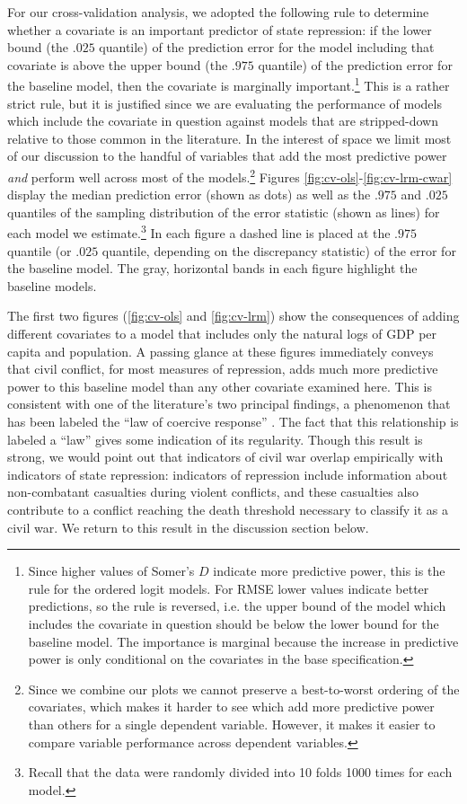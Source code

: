 \documentclass[11pt]{article}
\begin{document}
For our cross-validation analysis, we adopted the following rule to determine whether a covariate is an important predictor of state repression: if the lower bound (the $.025$ quantile) of the prediction error for the model including that covariate is above the upper bound (the $.975$ quantile) of the prediction error for the baseline model, then the covariate is marginally important.\footnote{Since higher values of Somer's $D$ indicate more predictive power, this is the rule for the ordered logit models. For RMSE lower values indicate better predictions, so the rule is reversed, i.e. the upper bound of the model which includes the covariate in question should be below the lower bound for the baseline model. The importance is marginal because the increase in predictive power is only conditional on the covariates in the base specification.} This is a rather strict rule, but it is justified since we are evaluating the performance of models which include the covariate in question against models that are stripped-down relative to those common in the literature. In the interest of space we limit most of our discussion to the handful of variables that add the most predictive power {\em and} perform well across most of the models.\footnote{Since we combine our plots we cannot preserve a best-to-worst ordering of the covariates, which makes it harder to see which add more predictive power than others for a single dependent variable. However, it makes it easier to compare variable performance across dependent variables.} Figures \ref{fig:cv-ols}-\ref{fig:cv-lrm-cwar} display the median prediction error (shown as dots) as well as the $.975$ and $.025$ quantiles of the sampling distribution of the error statistic (shown as lines) for each model we estimate.\footnote{Recall that the data were randomly divided into 10 folds 1000 times for each model.} In each figure a dashed line is placed at the $.975$ quantile (or $.025$ quantile, depending on the discrepancy statistic) of the error for the baseline model. The gray, horizontal bands in each figure highlight the baseline models.

The first two figures (\ref{fig:cv-ols} and \ref{fig:cv-lrm}) show the consequences of adding different covariates to a model that includes only the natural logs of GDP per capita and population. A passing glance at these figures immediately conveys that civil conflict, for most measures of repression, adds much more predictive power to this baseline model than any other covariate examined here. This is consistent with one of the literature's two principal findings, a phenomenon that has been labeled the ``law of coercive response'' \citep{Davenport2007AR}. The fact that this relationship is labeled a ``law'' gives some indication of its regularity. Though this result is strong, we would point out that indicators of civil war overlap empirically with indicators of state repression: indicators of repression include information about non-combatant casualties during violent conflicts, and these casualties also contribute to a conflict reaching the death threshold necessary to classify it as a civil war. We return to this result in the discussion section below. 
\end{document}
